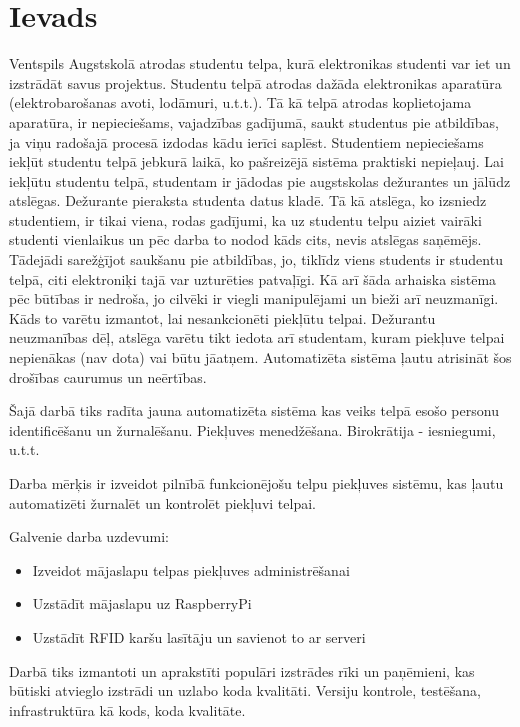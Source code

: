 \chapter*{Ievads}


Ventspils Augstskolā atrodas studentu telpa, kurā elektronikas studenti var iet un izstrādāt savus projektus. Studentu telpā atrodas dažāda elektronikas aparatūra (elektrobarošanas avoti, lodāmuri, u.t.t.). Tā kā telpā atrodas koplietojama aparatūra, ir nepieciešams, vajadzības gadījumā, saukt studentus pie atbildības, ja viņu radošajā procesā izdodas kādu ierīci saplēst.
Studentiem nepieciešams iekļūt studentu telpā jebkurā laikā, ko pašreizējā sistēma praktiski nepieļauj.
Lai iekļūtu studentu telpā, studentam ir jādodas pie augstskolas dežurantes un jālūdz atslēgas. Dežurante pieraksta studenta datus kladē. Tā kā atslēga, ko izsniedz studentiem, ir tikai viena, rodas gadījumi, ka uz studentu telpu aiziet vairāki studenti vienlaikus un pēc darba to nodod kāds cits, nevis atslēgas saņēmējs. Tādejādi sarežģījot saukšanu pie atbildības, jo, tiklīdz viens students ir studentu telpā, citi elektroniķi tajā var uzturēties patvaļīgi.
Kā arī šāda arhaiska sistēma pēc būtības ir nedroša, jo cilvēki ir viegli manipulējami un bieži arī neuzmanīgi. Kāds to varētu izmantot, lai nesankcionēti piekļūtu telpai. Dežurantu neuzmanības dēļ, atslēga varētu tikt iedota arī studentam, kuram piekļuve telpai nepienākas (nav dota) vai būtu jāatņem.
Automatizēta sistēma ļautu atrisināt šos drošības caurumus un neērtības.

Šajā darbā tiks radīta jauna automatizēta sistēma kas veiks telpā esošo personu identificēšanu un žurnalēšanu.
Piekļuves menedžēšana. Birokrātija - iesniegumi, u.t.t.

Darba mērķis ir izveidot pilnībā funkcionējošu telpu piekļuves sistēmu, kas ļautu automatizēti žurnalēt un kontrolēt piekļuvi telpai.


Galvenie darba uzdevumi:
\begin{itemize}
  \item Izveidot mājaslapu telpas piekļuves administrēšanai
  \item Uzstādīt mājaslapu uz RaspberryPi
  \item Uzstādīt RFID karšu lasītāju un savienot to ar serveri
\end{itemize}

Darbā tiks izmantoti un aprakstīti populāri izstrādes rīki un paņēmieni, kas būtiski atvieglo izstrādi un uzlabo koda kvalitāti.
Versiju kontrole, testēšana, infrastruktūra kā kods, koda kvalitāte.


